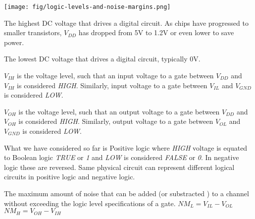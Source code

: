 \texttt{[image: fig/logic-levels-and-noise-margins.png]}

\begin{definition}
  \color{\notescol}
  The highest DC voltage that drives a digital circuit. As chips have progressed
  to smaller transistors, $V_{DD}$ has dropped from 5V to 1.2V or even lower to
  save power.
\end{definition}

\begin{definition}
  \color{\notescol}
  The lowest DC voltage that drives a digital circuit, typically 0V.
\end{definition}

\begin{definition}
  \color{\notescol}
  $V_{IH}$ is the voltage level, such that an input voltage to a gate between $V_{DD}$
  and $V_{IH}$ is considered \emph{HIGH}. Similarly, input voltage to a gate
  between $V_{IL}$ and $V_{GND}$ is considered \emph{LOW}.
\end{definition}

\begin{definition}
  \color{\notescol}
  $V_{OH}$ is the voltage level, such that an output voltage to a gate between $V_{DD}$
  and $V_{OH}$ is considered \emph{HIGH}. Similarly, output voltage to a gate
  between $V_{OL}$ and $V_{GND}$ is considered \emph{LOW}.
\end{definition}

\begin{definition}
  \color{\notescol}
  What we have considered so far is Positive logic where \emph{HIGH} voltage is
  equated to Boolean logic \emph{TRUE} or \emph{1} and \emph{LOW} is considered
  \emph{FALSE} or \emph{0}. In negative logic these are reversed. Same physical
  circuit can represent different logical circuits in positive logic and
  negative logic.
\end{definition}

\begin{definition}
  \color{\notescol}
  The maximum amount of noise that can be added (or substracted ) to a channel
  without exceeding the logic level specifications of a gate.  
  $NM_L  = V_{IL} - V_{OL}$ \\
  $NM_H  = V_{OH} - V_{IH}$
\end{definition}

